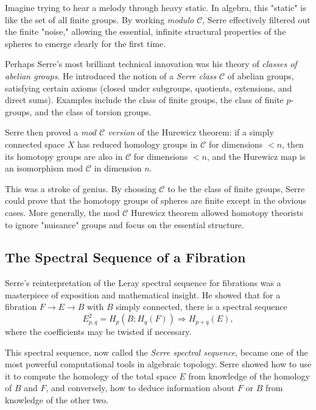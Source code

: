 \begin{bigidea}
Imagine trying to hear a melody through heavy static. In algebra, this "static" is like the set of all finite groups. By working \emph{modulo $\mathcal{C}$}, Serre effectively filtered out the finite "noise," allowing the essential, infinite structural properties of the spheres to emerge clearly for the first time.
\end{bigidea}

Perhaps Serre's most brilliant technical innovation was his theory of \emph{classes of abelian groups}. He introduced the notion of a \emph{Serre class} $\mathcal{C}$ of abelian groups, satisfying certain axioms (closed under subgroups, quotients, extensions, and direct sums). Examples include the class of finite groups, the class of finite $p$-groups, and the class of torsion groups.


Serre then proved a \emph{mod $\mathcal{C}$ version} of the Hurewicz theorem: if a simply connected space $X$ has reduced homology groups in $\mathcal{C}$ for dimensions $< n$, then its homotopy groups are also in $\mathcal{C}$ for dimensions $< n$, and the Hurewicz map is an isomorphism mod $\mathcal{C}$ in dimension $n$.

This was a stroke of genius. By choosing $\mathcal{C}$ to be the class of finite groups, Serre could prove that the homotopy groups of spheres are finite except in the obvious cases. More generally, the mod $\mathcal{C}$ Hurewicz theorem allowed homotopy theorists to ignore "nuisance" groups and focus on the essential structure.

\subsection{The Spectral Sequence of a Fibration}

Serre's reinterpretation of the Leray spectral sequence for fibrations was a masterpiece of exposition and mathematical insight. He showed that for a fibration $F \to E \to B$ with $B$ simply connected, there is a spectral sequence
\[
E^2_{p,q} = H_p(B; H_q(F)) \Longrightarrow H_{p+q}(E),
\]
where the coefficients may be twisted if necessary.

This spectral sequence, now called the \emph{Serre spectral sequence}, became one of the most powerful computational tools in algebraic topology. Serre showed how to use it to compute the homology of the total space $E$ from knowledge of the homology of $B$ and $F$, and conversely, how to deduce information about $F$ or $B$ from knowledge of the other two.

